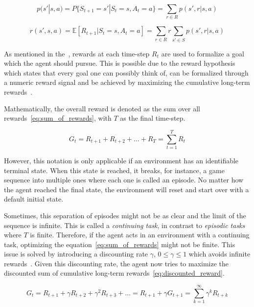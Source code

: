\documentclass[draft,final]{vutinfth} %
\newcommand{\p}[1]{see p. #1}
\begin{document}
    \begin{equation}
        p(s'|s,a) = P\{S_{t+1}=s'| S_t=s, A_t=a\} = \sum_{r \in \mathit{R}} p(s',r | s,a) \label{eq:transition}
    \end{equation}

    \begin{equation}
        r(s',s,a) = \mathbb{E}[R_{t+1} | S_t=s, A_t=a] = \sum_{r\in \mathit{R}} r \sum_{s' \in \mathit{S}} p(s',r | s,a) \label{eq:expected_reward}
    \end{equation}

    As mentioned in the~, rewards at each time-step $R_t$ are used to formalize a goal which the agent should pursue.
    This is possible due to the reward hypothesis which states that every goal one can possibly think of, can be formalized through a numeric reward signal and be achieved by maximizing the cumulative long-term rewards~\citep[\p{53}]{sutton_reinforcement_2018}.

    Mathematically, the overall reward is denoted as the sum over all rewards~\eqref{eq:sum_of_rewards}, with $T$ as the final time-step.

    \begin{equation}
        G_t=R_{t+1} + R_{t+2}+ \ldots + R_{T}  =\sum_{t=1}^{T} R_{t}\label{eq:sum_of_rewards}
    \end{equation}

    However, this notation is only applicable if an environment has an identifiable terminal state.
    When this state is reached, it breaks, for instance, a game sequence into multiple ones where each one is called an episode.
    No matter how the agent reached the final state, the environment will reset and start over with a default initial state.

    Sometimes, this separation of episodes might not be as clear and the limit of the sequence is infinite.
    This is called a \textit{continuing task}, in contrast to \textit{episodic tasks} where $T$ is finite.
    Therefore, if the agent acts in an environment with a continuing task, optimizing the equation~\eqref{eq:sum_of_rewards} might not be finite.
    This issue is solved by introducing a discounting rate $\gamma$, $0 \leq \gamma \leq 1$ which avoids infinite rewards~\citep[\p{54f}]{sutton_reinforcement_2018}.
    Given this discounting rate, the agent now tries to maximize the discounted sum of cumulative long-term rewards~\eqref{eq:discounted_reward}.

    \begin{equation}
        G_t = R_{t+1} + \gamma R_{t+2}+ \gamma^2 R_{t+3} + \ldots = R_{t+1} + \gamma G_{t+1} = \sum_{k=1}^{\infty} \gamma^k R_{t+k}\label{eq:discounted_reward}
    \end{equation}
\end{document}
